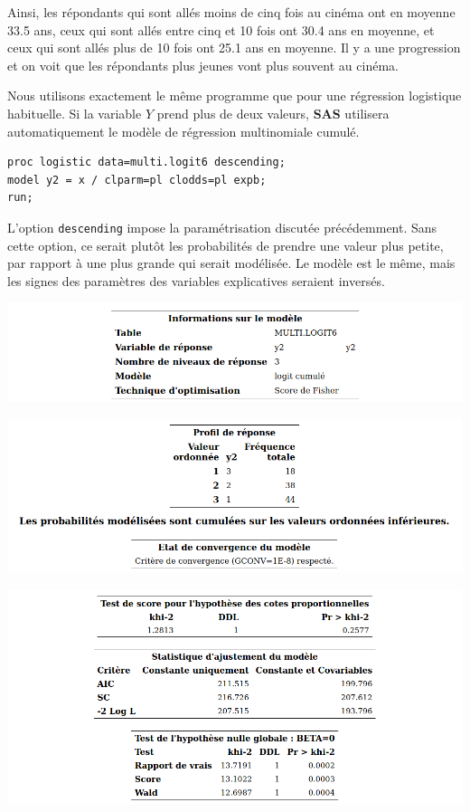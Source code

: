 \documentclass[
  11pt,
  letterpaper,
]{book}
\theoremstyle{definition}
\theoremstyle{definition}
\theoremstyle{definition}
\theoremstyle{remark}
\begin{document}
Ainsi, les répondants qui sont allés moins de cinq fois au cinéma ont en moyenne 33.5 ans, ceux qui sont allés entre cinq et 10 fois ont 30.4 ans en moyenne, et ceux qui sont allés plus de 10 fois ont 25.1 ans en moyenne. Il y a une progression et on voit que les répondants plus jeunes vont plus souvent au cinéma.

Nous utilisons exactement le même programme que pour une régression logistique habituelle. Si la variable \(Y\) prend plus de deux valeurs, \textbf{SAS} utilisera automatiquement le modèle de régression multinomiale cumulé.

\begin{verbatim}
proc logistic data=multi.logit6 descending;
model y2 = x / clparm=pl clodds=pl expb;
run;
\end{verbatim}

L'option \texttt{descending} impose la paramétrisation discutée précédemment. Sans cette option, ce serait plutôt les probabilités de prendre une valeur plus petite, par rapport à une plus grande qui serait modélisée. Le modèle est le même, mais les signes des paramètres des variables explicatives seraient inversés.

\begin{center}\includegraphics[width=0.8\linewidth]{figures/03-logistic-e26} \end{center}

\begin{center}\includegraphics[width=0.8\linewidth]{figures/03-logistic-e27} \end{center}

\begin{center}\includegraphics[width=0.8\linewidth]{figures/03-logistic-e28} \end{center}
\end{document}
